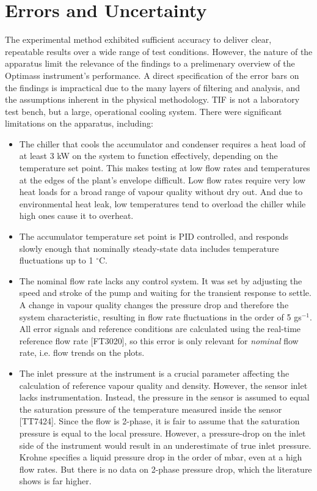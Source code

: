 \documentclass{report}
\begin{document}
\section{Errors and Uncertainty}
The experimental method exhibited sufficient accuracy to deliver clear, repeatable results over a wide range of test conditions. However, the nature of the apparatus limit the relevance of the findings to a prelimenary overview of the Optimass instrument's performance. A direct specification of the error bars on the findings is impractical due to the many layers of filtering and analysis, and the assumptions inherent in the physical methodology. TIF is not a laboratory test bench, but a large, operational cooling system. There were significant limitations on the apparatus, including:
\begin{itemize}
\item{The chiller that cools the accumulator and condenser requires a heat load of at least 3 kW on the system to function effectively, depending on the temperature set point. This makes testing at low flow rates and temperatures at the edges of the plant's envelope difficult. Low flow rates require very low heat loads for a broad range of vapour quality without dry out. And due to environmental heat leak, low temperatures tend to overload the chiller while high ones cause it to overheat.}
\item{The accumulator temperature set point is PID controlled, and responds slowly enough that nominally steady-state data includes temperature fluctuations up to 1 $^\circ$C.}
\item{The nominal flow rate lacks any control system. It was set by adjusting the speed and stroke of the pump and waiting for the transient response to settle. A change in vapour quality changes the pressure drop and therefore the system characteristic, resulting in flow rate fluctuations in the order of 5 gs$^{-1}$. All error signals and reference conditions are calculated using the real-time reference flow rate [FT3020], so this error is only relevant for \textit{nominal} flow rate, i.e. flow trends on the plots.}
\item{The inlet pressure at the instrument is a crucial parameter affecting the calculation of reference vapour quality and density. However, the sensor inlet lacks instrumentation. Instead, the pressure in the sensor is assumed to equal the saturation pressure of the temperature measured inside the sensor [TT7424]. Since the flow is 2-phase, it is fair to assume that the saturation pressure is equal to the local pressure. However, a pressure-drop on the inlet side of the instrument would result in an underestimate of true inlet pressure. Krohne specifies a liquid pressure drop in the order of mbar, even at a high flow rates. But there is no data on 2-phase pressure drop, which the literature shows is far higher.\cite{Mastrullo 2010}}
\end{itemize}
\end{document}
